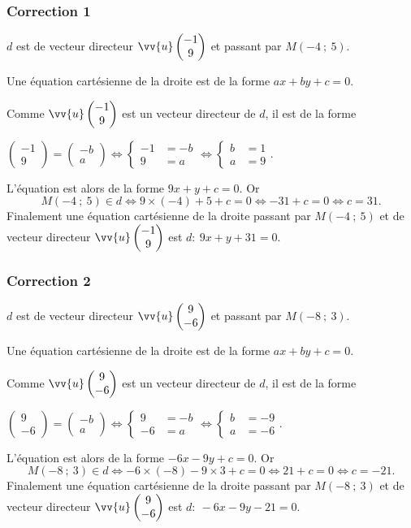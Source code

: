 \documentclass[15pt, mathserif]{beamer}
\newcommand{\vco}[2]{\begin{pmatrix} #1 \\ #2 \end{pmatrix}} %
\begin{document}
\begin{frame}
\vspace{-10mm}
	\frametitle{Correction 1}
\vspace*{2em}
$d$ est de vecteur directeur $\vv{u}\vco{-1}{9}$ et passant par $M\left(-4~;~5\right)$.

Une équation cartésienne de la droite est de la forme $ax+by+c=0$.

Comme  $\vv{u}\vco{-1}{9}$ est un vecteur directeur de $d$, il est de la forme 

\smallskip

\hfil $\vco{-1}{9}=\vco{-b}{a} \Leftrightarrow \begin{cases} -1& = -b \\ 9&=a \end{cases} \Leftrightarrow \begin{cases} b &= 1\\ a &=9\end{cases}.$\smallskip

 L'équation est alors de la forme $9x+y + c = 0$. Or \[M(-4~;~5) \in d \Leftrightarrow 9\times \left(-4\right)+5+c=0 \Leftrightarrow -31+c = 0 \Leftrightarrow c = 31.\] Finalement une équation cartésienne de la droite passant par $M\left(-4~;~5\right)$ et de vecteur directeur $\vv{u}\vco{-1}{9}$ est $d:~9x+y+31=0.$\end{frame}


\begin{frame}
\vspace{-10mm}
	\frametitle{Correction 2}
\vspace*{2em}
$d$ est de vecteur directeur $\vv{u}\vco{9}{-6}$ et passant par $M\left(-8~;~3\right)$.

Une équation cartésienne de la droite est de la forme $ax+by+c=0$.

Comme  $\vv{u}\vco{9}{-6}$ est un vecteur directeur de $d$, il est de la forme 

\smallskip

\hfil $\vco{9}{-6}=\vco{-b}{a} \Leftrightarrow \begin{cases} 9& = -b \\ -6&=a \end{cases} \Leftrightarrow \begin{cases} b &= -9\\ a &=-6\end{cases}.$\smallskip

 L'équation est alors de la forme $-6x-9y + c = 0$. Or \[M(-8~;~3) \in d \Leftrightarrow -6\times \left(-8\right)-9\times 3+c=0 \Leftrightarrow 21+c = 0 \Leftrightarrow c = -21.\] Finalement une équation cartésienne de la droite passant par $M\left(-8~;~3\right)$ et de vecteur directeur $\vv{u}\vco{9}{-6}$ est $d:~-6x-9y-21=0.$\end{frame}
\end{document}
